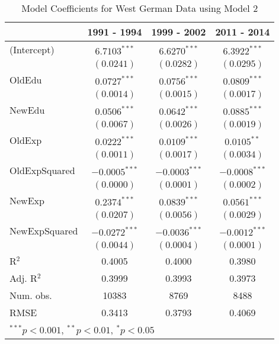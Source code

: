 
\begin{table}
\begin{center}
\begin{tiny}
\begin{tabular}{l c c c }
\hline
 & 1991 - 1994 & 1999 - 2002 & 2011 - 2014 \\
\hline
(Intercept)   & $6.7103^{***}$  & $6.6270^{***}$  & $6.3922^{***}$  \\
              & $(0.0241)$      & $(0.0282)$      & $(0.0295)$      \\
OldEdu        & $0.0727^{***}$  & $0.0756^{***}$  & $0.0809^{***}$  \\
              & $(0.0014)$      & $(0.0015)$      & $(0.0017)$      \\
NewEdu        & $0.0506^{***}$  & $0.0642^{***}$  & $0.0885^{***}$  \\
              & $(0.0067)$      & $(0.0026)$      & $(0.0019)$      \\
OldExp        & $0.0222^{***}$  & $0.0109^{***}$  & $0.0105^{**}$   \\
              & $(0.0011)$      & $(0.0017)$      & $(0.0034)$      \\
OldExpSquared & $-0.0005^{***}$ & $-0.0003^{***}$ & $-0.0008^{***}$ \\
              & $(0.0000)$      & $(0.0001)$      & $(0.0002)$      \\
NewExp        & $0.2374^{***}$  & $0.0839^{***}$  & $0.0561^{***}$  \\
              & $(0.0207)$      & $(0.0056)$      & $(0.0029)$      \\
NewExpSquared & $-0.0272^{***}$ & $-0.0036^{***}$ & $-0.0012^{***}$ \\
              & $(0.0044)$      & $(0.0004)$      & $(0.0001)$      \\
\hline
R$^2$         & 0.4005          & 0.4000          & 0.3980          \\
Adj. R$^2$    & 0.3999          & 0.3993          & 0.3973          \\
Num. obs.     & 10383           & 8769            & 8488            \\
RMSE          & 0.3413          & 0.3793          & 0.4069          \\
\hline
\multicolumn{4}{l}{\tiny{$^{***}p<0.001$, $^{**}p<0.01$, $^*p<0.05$}}
\end{tabular}
\end{tiny}
\caption{Model Coefficients for West German Data using Model 2}
\label{table:WestModelsOldNew}
\end{center}
\end{table}
